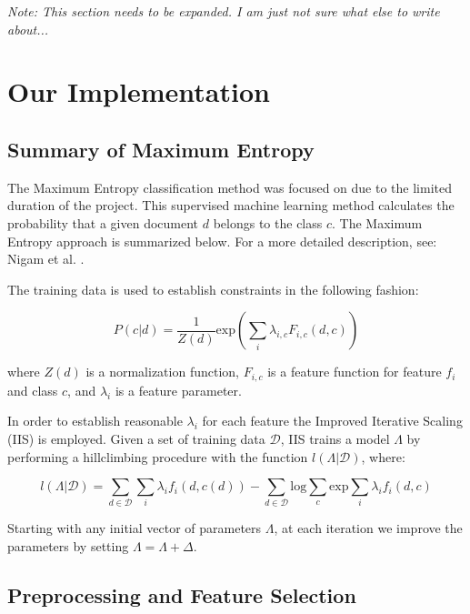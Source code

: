 \documentclass[final,3p,12pt]{elsarticle}
\begin{document}

\textit{Note: This section needs to be expanded. I am just not sure what else to write about...}

\section{Our Implementation}

\subsection{Summary of Maximum Entropy}

The Maximum Entropy classification method was focused on due to the limited
duration of the project. This supervised machine learning method calculates the
probability that a given document $d$ belongs to the class $c$.  The Maximum
Entropy approach is summarized below. For a more detailed description, see:
Nigam et al. \cite{Nigam1999}.

The training data is used to establish constraints in the following fashion:

\begin{equation}
    P(c | d) = \frac{1}{Z(d)} \mathrm{exp}(\sum\limits_{i} \lambda _{i,c} F_{i,c}(d,c) )
\end{equation}

where $Z(d)$ is a normalization function, $F_{i,c}$ is a feature function for
feature $f_{i}$ and class $c$, and $\lambda_{i}$ is a feature parameter.

In order to establish reasonable $\lambda_{i}$ for each feature the Improved
Iterative Scaling (IIS) is employed. Given a set of training data
$\mathcal{D}$, IIS trains a model $\Lambda$ by performing a hillclimbing
procedure with the function $l(\Lambda|\mathcal{D})$, where:

\begin{equation}
    l(\Lambda | \mathcal{D}) = \sum\limits_{d\in\mathcal{D}} \sum\limits_{i}
    \lambda_{i} f_{i}(d,c(d)) - \sum\limits_{d\in\mathcal{D}} \mathrm{log}
    \sum\limits_{c} \mathrm{exp} \sum\limits_{i} \lambda_{i} f_{i}(d,c)
\end{equation}

Starting with any initial vector of parameters $\Lambda$, at each iteration
we improve the parameters by setting $\Lambda = \Lambda + \Delta$.


\subsection{Preprocessing and Feature Selection}
\end{document}

